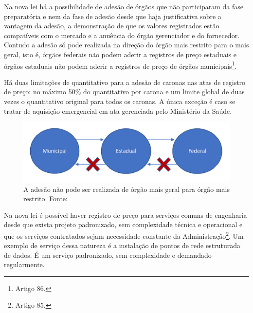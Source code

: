 Na nova lei há a possibilidade de adesão de órgãos que não participaram da fase preparatória e nem da fase de adesão desde que haja justificativa sobre a vantagem da adesão, a demonstração de que os valores registrados estão compatíveis com o mercado e a anuência do órgão gerenciador e do fornecedor. Contudo a adesão só pode realizada na direção do órgão mais restrito para o mais geral, isto é, órgãos federais não podem aderir a registros de preço estaduais e órgãos estaduais não podem aderir a registros de preço de órgãos municipais\footnote{Artigo 86.}.

Há duas limitações de quantitativo para a adesão de caronas nas atas de registro de preço: no máximo 50\% do quantitativo por carona e um limite global de duas vezes o quantitativo original para todos os caronas. A única exceção é caso se tratar de aquisição emergencial em ata gerenciada pelo Ministério da Saúde.

\begin{figure}
    \centering
    \includegraphics[scale=0.35]{conteudo/imagens/srp-adesao.png}
    \caption{A adesão não pode ser realizada de órgão mais geral para órgão mais restrito. Fonte: \citet{TCE2023}}
    \label{fig:srp-adesao}
\end{figure}

Na nova lei é possível haver registro de preço para serviços comuns de engenharia desde que exista projeto padronizado, sem complexidade técnica e operacional e que os serviços contratados sejam necessidade constante da Administração\footnote{Artigo 85.}. Um exemplo de serviço dessa natureza é a instalação de pontos de rede estruturada de dados. É um serviço padronizado, sem complexidade e demandado regularmente.